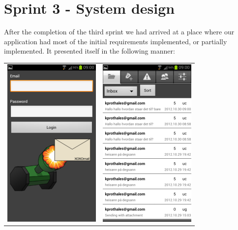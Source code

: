 \section{Sprint 3 - System design}
After the completion of the third sprint we had arrived at a place where our application had most of the initial requirements implemented, or partially implemented. It presented itself in the following manner:
\newline
\newline
\begin{tabular}{cc}
\includegraphics{logingui} & \includegraphics{inbox}
\end{tabular}

